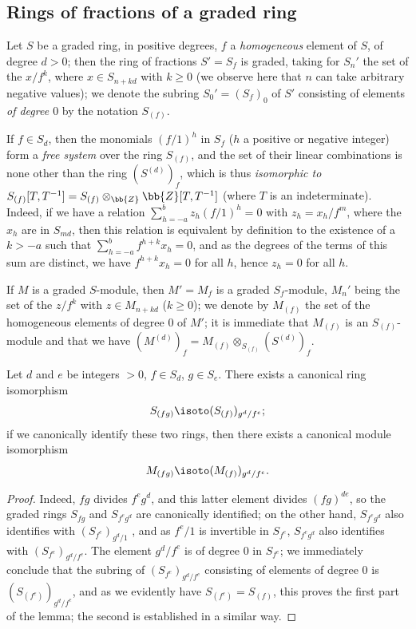 \subsection{Rings of fractions of a graded ring}
\label{subsection:II.2.2}

\begin{env}[2.2.1]
\label{II.2.2.1}
Let $S$ be a graded ring, in positive degrees, $f$ a \emph{homogeneous} element of $S$, of degree $d>0$;
then the ring of fractions $S'=S_f$ is graded, taking for $S_n'$ the set of the $x/f^k$, where $x\in S_{n+kd}$ with $k\geq 0$ (we observe here that $n$ can take arbitrary negative values);
we denote the subring $S_0'=(S_f)_0$ of $S'$ consisting of elements \emph{of degree $0$} by the notation $S_{(f)}$.

If $f\in S_d$, then the monomials $(f/1)^h$ in $S_f$ ($h$ a positive or negative integer) form a \emph{free system} over the ring $S_{(f)}$, and the set of their linear combinations is none other than
the ring $(S^{(d)})_f$, which is thus \emph{isomorphic to $S_{(f)}[T,T^{-1}]=S_{(f)}\otimes_\bb{Z}\bb{Z}[T,T^{-1}]$} (where $T$ is an indeterminate).
Indeed, if we have a relation $\sum_{h=-a}^b z_h(f/1)^h=0$ with $z_h=x_h/f^m$, where the $x_h$ are in $S_{md}$, then this relation is equivalent by definition to the existence of a $k>-a$ such that $\sum_{h=-a}^b f^{h+k}x_h=0$, and as the degrees of the terms of this sum are distinct, we have $f^{h+k}x_h=0$ for all $h$, hence $z_h=0$ for all $h$.

If $M$ is a graded $S$-module, then $M'=M_f$ is a graded $S_f$-module, $M_n'$ being the set of the $z/f^k$ with $z\in M_{n+kd}$ ($k\geq 0$);
we denote by $M_{(f)}$ the set of the homogeneous elements of degree $0$ of $M'$;
it is immediate that $M_{(f)}$ is an $S_{(f)}$-module and that we have $(M^{(d)})_f=M_{(f)}\otimes_{S_{(f)}}(S^{(d)})_f$.
\end{env}

\begin{lemma}[2.2.2]
\label{II.2.2.2}
Let $d$ and $e$ be integers $>0$, $f\in S_d$, $g\in S_e$.
There exists a canonical ring isomorphism
\[
  S_{(fg)}\isoto(S_{(f)})_{g^d/f^e};
\]
if we canonically identify these two rings, then there exists a canonical module isomorphism
\[
  M_{(fg)}\isoto(M_{(f)})_{g^d/f^e}.
\]
\end{lemma}

\begin{proof}
Indeed, $fg$ divides $f^e g^d$, and this latter element divides $(fg)^{de}$, so the graded rings $S_{fg}$ and $S_{f^e g^d}$ are canonically identified;
on the other hand, $S_{f^e g^d}$ also identifies with $(S_{f^e})_{g^d/1}$ , and as $f^e/1$ is invertible in $S_{f^e}$, $S_{f^e g^d}$ also identifies with $(S_{f^e})_{g^d/f^e}$.
The element $g^d/f^e$ is of degree $0$ in $S_{f^e}$;
we immediately conclude that the subring of $(S_{f^e})_{g^d/f^e}$ consisting of elements of degree $0$ is $(S_{(f^e)})_{g^d/f^e}$, and as we evidently have $S_{(f^e)}=S_{(f)}$, this proves the first part of the lemma;
the second is established in a similar way.
\end{proof}

